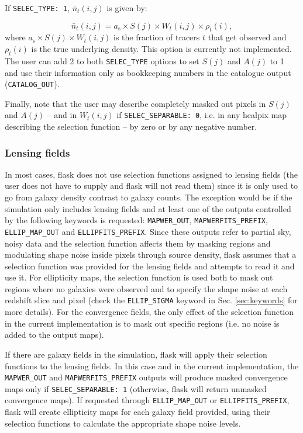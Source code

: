 \documentclass[12pt]{book} %
\begin{document}
If {\tt SELEC\_TYPE: 1}, $\bar{n}_t(i,j)$ is given by:

\begin{equation}
\bar{n}_t(i,j) = a_{\mathrm{s}} \times S(j) \times W_t(i,j) \times \rho_t(i),
\label{eq:fraction-selection-function} 
\end{equation}
where $a_{\mathrm{s}} \times S(j) \times W_t(i,j)$ is the fraction of tracers $t$ 
that get observed and $\rho_t(i)$ is the true underlying density. This option is 
currently not implemented. The user can add 2 to both {\tt SELEC\_TYPE} options 
to set $S(j)$ and $A(j)$ to 1 and use their information only as bookkeeping numbers 
in the catalogue output ({\tt CATALOG\_OUT}). 

Finally, note that the user may describe completely masked out pixels in $S(j)$ and $A(j)$  
-- and in $W_t(i,j)$ if {\tt SELEC\_SEPARABLE: 0}, i.e. in any {\sc healpix} map describing the 
selection function -- by zero or by any negative number.

\subsubsection{Lensing fields}

In most cases, {\sc flask} does not use selection functions assigned to lensing fields 
(the user does not have to supply and {\sc flask} will not read them) since it 
is only used to go from galaxy density contrast to galaxy counts. The exception would be 
if the simulation only includes lensing fields and at least one of the outputs controlled by the 
following keywords is requested: {\tt MAPWER\_OUT}, {\tt MAPWERFITS\_PREFIX}, 
{\tt ELLIP\_MAP\_OUT} and {\tt ELLIPFITS\_PREFIX}. Since these outputs refer to partial 
sky, noisy data and the selection function affects them by masking regions and modulating 
shape noise inside pixels through source density, {\sc flask} assumes that a selection 
function was provided for the lensing fields and attempts to read it and use it. 
For ellipticity maps, the selection function is used both to mask out regions where no 
galaxies were observed and to specify the shape noise at each redshift slice and pixel
(check the {\tt ELLIP\_SIGMA} keyword in Sec. \ref{sec:keywords} for more details).
For the convergence fields, the only effect of the selection function in the current 
implementation is to mask out specific regions (i.e. no noise is added to the output maps). 

If there are galaxy fields in the simulation, {\sc flask} will apply their selection 
functions to the lensing fields. In this case and in the current implementation, 
the {\tt MAPWER\_OUT} and {\tt MAPWERFITS\_PREFIX} 
outputs will produce masked convergence maps only if {\tt SELEC\_SEPARABLE: 1} 
(otherwise, {\sc flask} will return unmasked convergence maps). If requested through 
{\tt ELLIP\_MAP\_OUT} or {\tt ELLIPFITS\_PREFIX}, {\sc flask} will create ellipticity 
maps for each galaxy field provided, using their selection functions to calculate the 
appropriate shape noise levels. 
 
\end{document}
